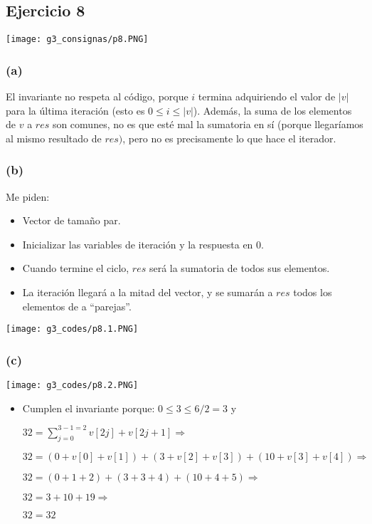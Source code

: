 \documentclass[12 pt]{article}
\begin{document}
\subsection*{Ejercicio 8}
    \begin{center}
        \texttt{[image: g3\_consignas/p8.PNG]}
    \end{center}
    \subsubsection*{(a)}
        El invariante no respeta al código, porque $i$ termina adquiriendo el valor de $|v|$ para la última iteración (esto es $0 \leq i \leq |v|$). Además, la suma de los elementos de $v$ a $res$ son comunes, no es que esté mal la sumatoria en sí (porque llegaríamos al mismo resultado de $res)$, pero no es precisamente lo que hace el iterador.
    \subsubsection*{(b)}
        Me piden:
        \begin{itemize}
            \item Vector de tamaño par.
            \item Inicializar las variables de iteración y la respuesta en 0.
            \item Cuando termine el ciclo, $res$ será la sumatoria de todos sus elementos.
            \item La iteración llegará a la mitad del vector, y se sumarán a $res$ todos los elementos de a ``parejas''.
        \end{itemize}
        \begin{center}
            \texttt{[image: g3\_codes/p8.1.PNG]}
        \end{center}
    \subsubsection*{(c)}
        \begin{center}
            \texttt{[image: g3\_codes/p8.2.PNG]}
        \end{center}
        \begin{itemize}
            \item Cumplen el invariante porque: $0 \leq 3 \leq 6/2 = 3$ y 
            
            $32 = \sum^{3-1 = 2}_{j = 0}v[2j]+v[2j+1] \Rightarrow $ 
            
            $32 = (0+v[0]+v[1])+(3+v[2]+v[3])+(10+v[3]+v[4]) \Rightarrow$ 
            
            $32 = (0+1+2)+(3+3+4)+(10+4+5) \Rightarrow $

            $32 = 3+10+19 \Rightarrow $

            $32 = 32$
        \end{itemize}
\end{document}
